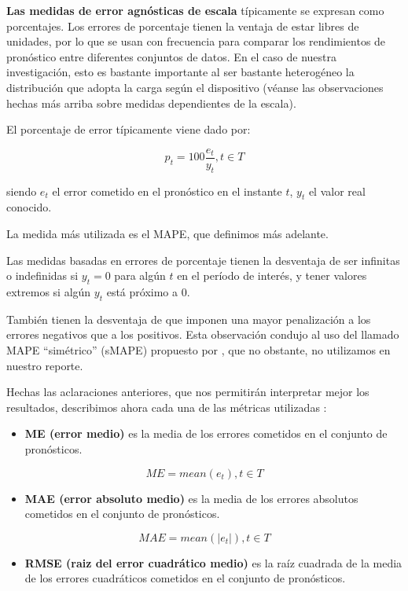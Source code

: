 \documentclass[]{book}
\providecommand{\tightlist}{%
  \setlength{\itemsep}{0pt}\setlength{\parskip}{0pt}}
\begin{document}
\textbf{Las medidas de error agnósticas de escala} típicamente se
expresan como porcentajes. Los errores de porcentaje tienen la ventaja
de estar libres de unidades, por lo que se usan con frecuencia para
comparar los rendimientos de pronóstico entre diferentes conjuntos de
datos. En el caso de nuestra investigación, esto es bastante importante
al ser bastante heterogéneo la distribución que adopta la carga según el
dispositivo (véanse las observaciones hechas más arriba sobre medidas
dependientes de la escala).

El porcentaje de error típicamente viene dado por:

\[p_t = 100 \frac{e_t}{y_t}, t \in T\]

siendo \(e_t\) el error cometido en el pronóstico en el instante \(t\),
\(y_{t}\) el valor real conocido.

La medida más utilizada es el MAPE, que definimos más adelante.

Las medidas basadas en errores de porcentaje tienen la desventaja de ser
infinitas o indefinidas si \(y_{t}=0\) para algún \(t\) en el período de
interés, y tener valores extremos si algún \(y_{t}\) está próximo a 0.

También tienen la desventaja de que imponen una mayor penalización a los
errores negativos que a los positivos. Esta observación condujo al uso
del llamado MAPE ``simétrico'' (sMAPE) propuesto por
\citep{armstrong1985long}, que no obstante, no utilizamos en nuestro
reporte.

Hechas las aclaraciones anteriores, que nos permitirán interpretar mejor
los resultados, describimos ahora cada una de las métricas utilizadas
\citep{hyndman2006another}:

\begin{itemize}
\tightlist
\item
  \textbf{ME (error medio)} es la media de los errores cometidos en el
  conjunto de pronósticos.
\end{itemize}

\[ ME = mean(e_t), t\in T \]

\begin{itemize}
\tightlist
\item
  \textbf{MAE (error absoluto medio)} es la media de los errores
  absolutos cometidos en el conjunto de pronósticos.
\end{itemize}

\[ MAE = mean(|e_t|), t\in T \]

\begin{itemize}
\tightlist
\item
  \textbf{RMSE (raiz del error cuadrático medio)} es la raíz cuadrada de
  la media de los errores cuadráticos cometidos en el conjunto de
  pronósticos.
\end{itemize}
\end{document}
